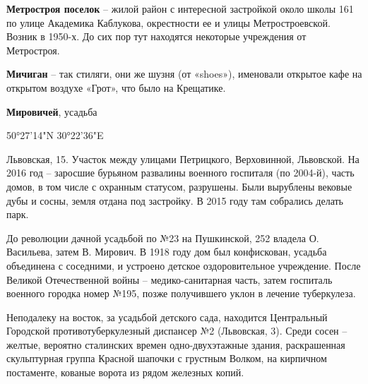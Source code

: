 \textbf{Метростроя поселок} – жилой район с интересной застройкой около школы 161 по улице Академика Каблукова, окрестности ее и улицы Метростроевской. Возник в 1950-х. До сих пор тут находятся некоторые учреждения от Метростроя.\\

\medskip

\textbf{Мичиган} – так стиляги, они же шузня (от «shoes»), именовали открытое кафе на открытом воздухе «Грот», что было на Крещатике.\\

\medskip

\textbf{Мировичей}, усадьба

50°27'14"N 30°22'36"E

Львовская, 15. Участок между улицами Петрицкого, Верховинной, Львовской. На 2016 год – заросшие бурьяном развалины военного госпиталя (по 2004-й), часть домов, в том числе с охранным статусом, разрушены. Были вырублены вековые дубы и сосны, земля отдана под застройку. В 2015 году там собрались делать парк.

До революции дачной усадьбой по №23 на Пушкинской, 252 владела О. Васильева, затем В. Мирович. В 1918 году дом был конфискован, усадьба объединена с соседними, и устроено детское оздоровительное учреждение. После Великой Отечественной войны – медико-санитарная часть, затем госпиталь военного городка номер №195, позже получившего уклон в лечение туберкулеза.

Неподалеку на восток, за усадьбой детского сада, находится Центральный Городской противотуберкулезный диспансер №2 (Львовская, 3). Среди сосен – желтые, вероятно сталинских времен одно-двухэтажные здания, раскрашенная скульптурная группа Красной шапочки с грустным Волком, на кирпичном постаменте, кованые ворота из рядом железных копий.\\

\medskip


